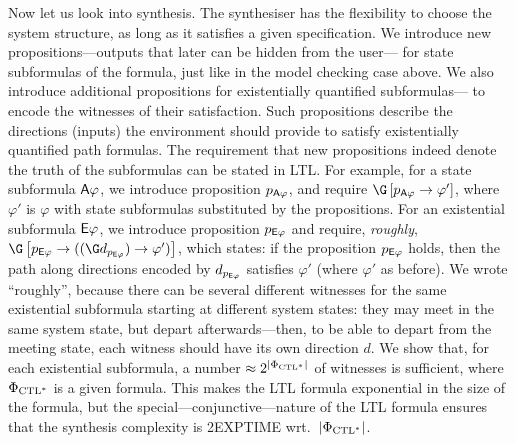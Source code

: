 Now let us look into \CTLstar synthesis.
The synthesiser has the flexibility to choose the system structure, 
as long as it satisfies a given specification.
We introduce new propositions---outputs that later can be hidden from the user---%
for state subformulas of the \CTLstar formula,
just like in the model checking case above.
We also introduce additional propositions for existentially quantified subformulas---%
to encode the witnesses of their satisfaction.
Such propositions describe the directions (inputs) the environment should provide
to satisfy existentially quantified path formulas.
The requirement that new propositions indeed denote the truth of the subformulas can be stated in LTL.
For example, for a state subformula ${\operatorname{\mathsf{A}}}\varphi$, we introduce proposition $p_{{\operatorname{\mathsf{A}}}\varphi}$,
and require $\G\left[ p_{\A\varphi} \impl \varphi' \right]$,
where $\varphi'$ is $\varphi$ with state subformulas substituted by the propositions.
For an existential subformula ${\operatorname{\mathsf{E}}}\varphi$,
we introduce proposition $p_{{\operatorname{\mathsf{E}}}\varphi}$ and require,
\emph{roughly}, $\G\left[ p_{\E\varphi} \impl ((\G d_{p_{\E\varphi}}) \impl \varphi')\right]$, which states:
if the proposition $p_{{\operatorname{\mathsf{E}}}\varphi}$ holds, then the path along directions encoded by $d_{p_{{\operatorname{\mathsf{E}}}\varphi}}$
satisfies $\varphi'$ (where $\varphi'$ as before).
We wrote ``roughly'', because
there can be several different witnesses for the same existential subformula
starting at different system states:
they may meet in the same system state,
but depart afterwards---then, to be able to depart from the meeting state,
each witness should have its own direction $d$.
We show that, for each existential subformula, a number $\approx 2^{|\Phi_{\text{CTL}^*}|}$ of witnesses is sufficient,
where $\Phi_{\text{CTL}^*}$ is a given \CTLstar formula.
This makes the LTL formula exponential in the size of the \CTLstar formula,
but the special---conjunctive---nature of the LTL formula ensures
that the synthesis complexity is 2EXPTIME wrt.\ $|\Phi_{\text{CTL}^*}|$.

